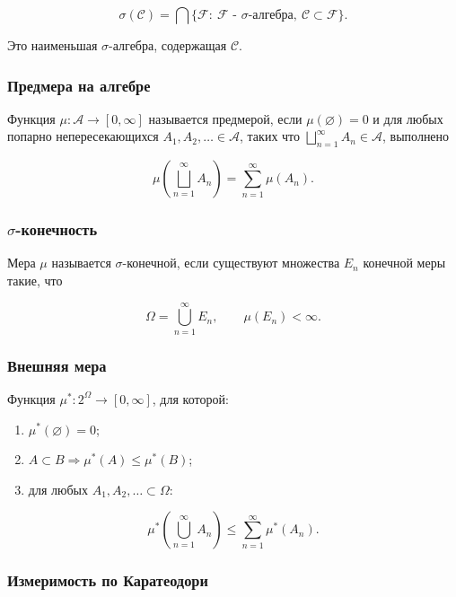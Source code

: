 \documentclass[
  11pt,
  a4paper,
]{article}
\providecommand{\tightlist}{%
  \setlength{\itemsep}{0pt}\setlength{\parskip}{0pt}}
\begin{document}
\[
\sigma(\mathcal C)=
\bigcap\{\mathcal F:\ \mathcal F\text{ - }\sigma\text{-алгебра},\ \mathcal C\subset\mathcal F\}.
\]

Это наименьшая \(\sigma\)-алгебра, содержащая \(\mathcal C\).

\subsubsection{Предмера на
алгебре}\label{ux43fux440ux435ux434ux43cux435ux440ux430-ux43dux430-ux430ux43bux433ux435ux431ux440ux435}

Функция \(\mu:\mathcal A\to[0,\infty]\) называется предмерой, если
\(\mu(\varnothing)=0\) и для любых попарно непересекающихся
\(A_1,A_2,\ldots\in\mathcal A\), таких что
\(\bigsqcup_{n=1}^{\infty}A_n\in\mathcal A\), выполнено

\[
\mu\left(\bigsqcup_{n=1}^{\infty}A_n\right)
=
\sum_{n=1}^{\infty}\mu(A_n).
\]

\subsubsection{\texorpdfstring{\(\sigma\)-конечность}{\textbackslash sigma-конечность}}\label{sigma-ux43aux43eux43dux435ux447ux43dux43eux441ux442ux44c}

Мера \(\mu\) называется \(\sigma\)-конечной, если существуют множества
\(E_n\) конечной меры такие, что

\[
\Omega=\bigcup_{n=1}^{\infty}E_n,
\qquad
\mu(E_n)<\infty.
\]

\subsubsection{Внешняя
мера}\label{ux432ux43dux435ux448ux43dux44fux44f-ux43cux435ux440ux430}

Функция \(\mu^*:2^\Omega\to[0,\infty]\), для которой:

\begin{enumerate}
\def\labelenumi{\arabic{enumi}.}
\tightlist
\item
  \(\mu^*(\varnothing)=0\);
\item
  \(A\subset B\Rightarrow\mu^*(A)\le\mu^*(B)\);
\item
  для любых \(A_1,A_2,\ldots\subset\Omega\):
\end{enumerate}

\[
\mu^*\left(\bigcup_{n=1}^{\infty}A_n\right)
\le
\sum_{n=1}^{\infty}\mu^*(A_n).
\]

\subsubsection{Измеримость по
Каратеодори}\label{ux438ux437ux43cux435ux440ux438ux43cux43eux441ux442ux44c-ux43fux43e-ux43aux430ux440ux430ux442ux435ux43eux434ux43eux440ux438}
\end{document}

